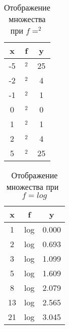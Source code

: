 \documentclass[]{scrartcl}
\begin{document}
\begin{table}[ht]
	\caption{Отображение множества при $f=^2$} \label{tab:function-square}
	\centering%
	\begin{tabular}{ccc} 
		\hline
		x  & f & y 
		\\ \hline \hline
		-5 & $^2$ & 25 \\ 
		-2 & $^2$ & 4 \\ 
		-1 & $^2$ & 1 \\ 
		0 & $^2$ & 0 \\ 
		1 & $^2$ & 1 \\ 
		2 & $^2$ & 4 \\ 
		5 & $^2$ & 25 \\
		\hline	
	\end{tabular}
\end{table}

\begin{table}[ht]
	\caption{Отображение множества при~$f=log$} \label{tab:function-log}
	\centering%
	\begin{tabular}{ccc} 
		\hline
		x  & f & y 
		\\ \hline \hline
		1 & log & 0.000 \\ 
		2 & log & 0.693 \\ 
		3 & log & 1.099 \\ 
		5 & log & 1.609 \\ 
		8 & log & 2.079 \\ 
		13 & log & 2.565 \\ 
		21 & log & 3.045 \\ 
		\hline	
	\end{tabular}
\end{table}
\end{document}
